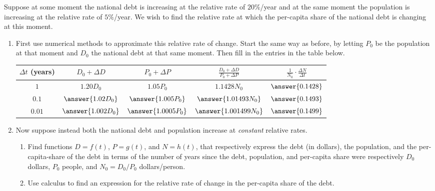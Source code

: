 \documentclass{ximera}
\begin{document}
\begin{question} \label{Q1wwf3zm88}
Suppose at some moment the national debt is increasing at the relative rate of $20\%$/year and at the same moment the population is increasing at the relative rate of $5\%$/year. We wish to find the relative rate at which the per-capita share of the national debt is changing at this moment.

\begin{enumerate}
\item First use numerical methods to approximate this relative rate of change. Start the same way as before, by letting $P_0$ be the population at that moment and $D_0$ the national debt at that same moment. Then fill in the entries in the table below.
\begin{center}
  \begin{tabular}{ | c| c | c | c | c |}
    \hline
    $\Delta t$ (years) & $D_0+\Delta D$ & $P_0 + \Delta P$ & $\frac{D_0+\Delta D}{P_0+\Delta P}$ & $\frac{1}{N_0}\cdot \frac{\Delta N}{\Delta t}$ \\ \hline
      $1$ & $1.20D_0$ & $1.05P_0$ &  $1.1428N_0$ & $\answer{0.1428}$ \\ \hline
    $0.1$ & $\answer{1.02D_0}$ & $\answer{1.005P_0}$ &  $\answer{1.01493N_0}$ & $\answer{0.1493}$ \\ \hline
    $0.01$  & $\answer{1.002D_0}$  & $\answer{1.0005P_0}$  & $\answer{1.001499N_0}$ & $\answer{0.1499}$  \\ \hline
           \hline
  \end{tabular}
\end{center}





\item Now suppose instead both the national debt and population increase at \emph{constant} relative rates.

\begin{enumerate}
\item Find functions $D=f(t)$, $P=g(t)$, and $N=h(t)$, that respectively express the debt (in dollars), the population, and the per-capita-share of the debt in terms of the number of years since the debt, population, and per-capita share were respectively $D_0$ dollars, $P_0$ people, and $N_0 = D_0/P_0$ dollars/person.

\item Use calculus to find an expression for the relative rate of change in the per-capita share of the debt. 


\end{enumerate}
\end{enumerate}
\end{question}
\end{document}
